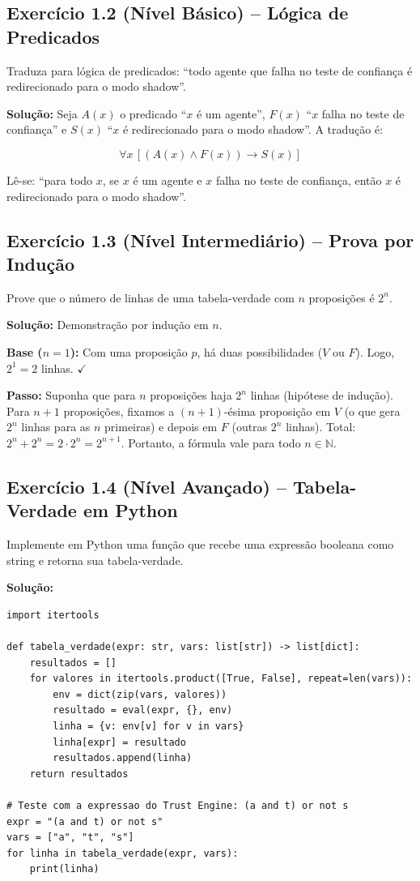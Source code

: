 \subsection*{Exercício 1.2 (Nível Básico) -- Lógica de Predicados}
Traduza para lógica de predicados: ``todo agente que falha no teste de
confiança é redirecionado para o modo shadow''.

\textbf{Solução:} Seja $A(x)$ o predicado ``$x$ é um agente'', $F(x)$
``$x$ falha no teste de confiança'' e $S(x)$ ``$x$ é redirecionado para
o modo shadow''. A tradução é:

\[
\forall x\,[(A(x) \land F(x)) \to S(x)]
\]

Lê-se: ``para todo $x$, se $x$ é um agente e $x$ falha no teste de
confiança, então $x$ é redirecionado para o modo shadow''.

\subsection*{Exercício 1.3 (Nível Intermediário) -- Prova por Indução}
Prove que o número de linhas de uma tabela-verdade com $n$ proposições é $2^n$.

\textbf{Solução:} Demonstração por indução em $n$.

\textbf{Base ($n=1$):} Com uma proposição $p$, há duas possibilidades
($V$ ou $F$). Logo, $2^1 = 2$ linhas. $\checkmark$

\textbf{Passo:} Suponha que para $n$ proposições haja $2^n$ linhas
(hipótese de indução). Para $n+1$ proposições, fixamos a $(n+1)$-ésima
proposição em $V$ (o que gera $2^n$ linhas para as $n$ primeiras) e
depois em $F$ (outras $2^n$ linhas). Total: $2^n + 2^n = 2 \cdot 2^n = 2^{n+1}$.
Portanto, a fórmula vale para todo $n \in \mathbb{N}$.

\subsection*{Exercício 1.4 (Nível Avançado) -- Tabela-Verdade em Python}
Implemente em Python uma função que recebe uma expressão booleana como
string e retorna sua tabela-verdade.

\textbf{Solução:}
\begin{lstlisting}[style=pythonstyle]
import itertools

def tabela_verdade(expr: str, vars: list[str]) -> list[dict]:
    resultados = []
    for valores in itertools.product([True, False], repeat=len(vars)):
        env = dict(zip(vars, valores))
        resultado = eval(expr, {}, env)
        linha = {v: env[v] for v in vars}
        linha[expr] = resultado
        resultados.append(linha)
    return resultados

# Teste com a expressao do Trust Engine: (a and t) or not s
expr = "(a and t) or not s"
vars = ["a", "t", "s"]
for linha in tabela_verdade(expr, vars):
    print(linha)
\end{lstlisting}

